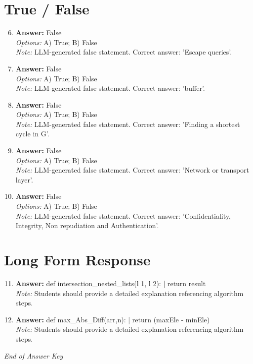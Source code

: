 \documentclass[12pt]{article}
\begin{document}
\section*{True / False}
\begin{enumerate}[label=\arabic*.]
\setcounter{enumi}{5}
\item \textbf{Answer:} False
\\ \textit{Options:} A) True; B) False
\\ \textit{Note:} LLM-generated false statement. Correct answer: 'Escape queries'.
\item \textbf{Answer:} False
\\ \textit{Options:} A) True; B) False
\\ \textit{Note:} LLM-generated false statement. Correct answer: 'buffer'.
\item \textbf{Answer:} False
\\ \textit{Options:} A) True; B) False
\\ \textit{Note:} LLM-generated false statement. Correct answer: 'Finding a shortest cycle in G'.
\item \textbf{Answer:} False
\\ \textit{Options:} A) True; B) False
\\ \textit{Note:} LLM-generated false statement. Correct answer: 'Network or transport layer'.
\item \textbf{Answer:} False
\\ \textit{Options:} A) True; B) False
\\ \textit{Note:} LLM-generated false statement. Correct answer: 'Confidentiality, Integrity, Non repudiation and Authentication'.
\end{enumerate}

\section*{Long Form Response}
\begin{enumerate}[label=\arabic*.]
\setcounter{enumi}{10}
\item \textbf{Answer:} def intersection\_nested\_lists(l 1, l 2): | return result
\\ \textit{Note:} Students should provide a detailed explanation referencing algorithm steps.
\item \textbf{Answer:} def max\_Abs\_Diff(arr,n): | return (maxEle - minEle)
\\ \textit{Note:} Students should provide a detailed explanation referencing algorithm steps.
\end{enumerate}

\vfill
\noindent\textit{End of Answer Key}
\end{document}
